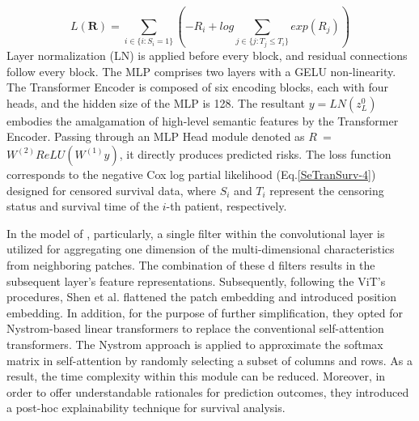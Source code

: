 \documentclass[journal,twoside,web]{ieeecolor}
\begin{document}
\begin{equation}\label{SeTranSurv-4}
L(\boldsymbol{R})=\sum_{i\in\{i:S_i=1\}}(-R_i+log\sum_{j\in\{j:T_j\leq T_i\}}exp(R_j))
\end{equation}
Layer normalization (LN) is applied before every block, and residual connections follow every block. 
The MLP comprises two layers with a GELU non-linearity. 
The Transformer Encoder is composed of six encoding blocks, each with four heads, and the hidden size of the MLP is 128.
The resultant $y=LN(z_L^0)$ embodies the amalgamation of high-level semantic features by the Transformer Encoder. 
Passing through an MLP Head module denoted as $R~=$ $W^{(2)}ReLU(W^{(1)}y)$, it directly produces predicted risks. 
The loss function corresponds to the negative Cox log partial likelihood (Eq.\ref{SeTranSurv-4}) designed for censored survival data, where $S_i$ and $T_i$ represent the censoring status and survival time of the $i$-th patient, respectively.

In the model of \cite{shen2022explainable}, particularly, a single filter within the convolutional layer is utilized for aggregating one dimension of the multi-dimensional characteristics from neighboring patches. 
The combination of these d filters results in the subsequent layer's feature representations.
Subsequently, following the ViT's procedures, Shen et al. flattened the patch embedding and introduced position embedding. 
In addition, for the purpose of further simplification, they opted for Nystrom-based linear transformers\cite{verma2021beyond} to replace the conventional self-attention transformers. 
The Nystrom approach is applied to approximate the softmax matrix in self-attention by randomly selecting a subset of columns and rows. 
As a result, the time complexity within this module can be reduced.
Moreover, in order to offer understandable rationales for prediction outcomes, they introduced a post-hoc explainability technique for survival analysis.
\end{document}
